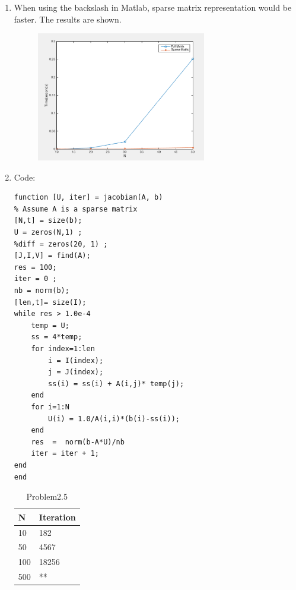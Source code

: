 \documentclass{article}
\begin{document}
\begin{enumerate}
\item
When using the backslash in Matlab, sparse matrix representation would be faster.  The results are shown. 
\begin{figure}
\includegraphics[width=0.7\textwidth]{full_vs_sparse}
\end{figure}  

\item 

Code: \\
\begin{lstlisting} 
function [U, iter] = jacobian(A, b)
% Assume A is a sparse matrix
[N,t] = size(b); 
U = zeros(N,1) ;
%diff = zeros(20, 1) ; 
[J,I,V] = find(A); 
res = 100; 
iter = 0 ; 
nb = norm(b); 
[len,t]= size(I);  
while res > 1.0e-4 
    temp = U; 
    ss = 4*temp; 
    for index=1:len
        i = I(index); 
        j = J(index); 
        ss(i) = ss(i) + A(i,j)* temp(j); 
    end
    for i=1:N
        U(i) = 1.0/A(i,i)*(b(i)-ss(i)); 
    end
    res  =  norm(b-A*U)/nb      
    iter = iter + 1; 
end
end
\end{lstlisting} 

\begin{table}[!htbp]
\centering
\caption{Problem2.5}
\label{my-label}
\begin{tabular}{|l|l|}
\hline
N   & Iteration \\ \hline
10  & 182       \\ \hline
50  &  4567         \\ \hline
100 &  18256         \\ \hline
500 &    **       \\ \hline
\end{tabular}
\end{table}


\end{enumerate}
\end{document}
